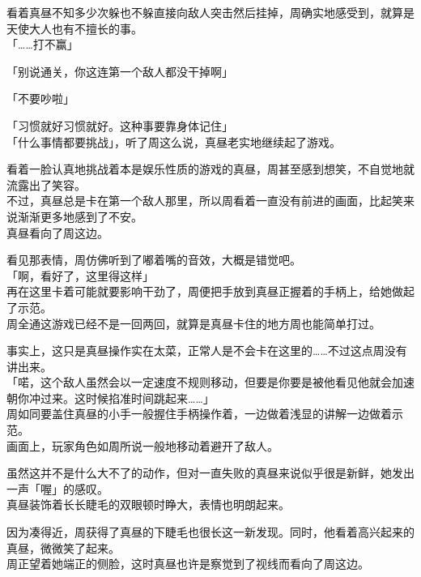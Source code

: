 看着真昼不知多少次躲也不躲直接向敌人突击然后挂掉，周确实地感受到，就算是天使大人也有不擅长的事。\\

「……打不赢」

「别说通关，你这连第一个敌人都没干掉啊」

「不要吵啦」

「习惯就好习惯就好。这种事要靠身体记住」\\

「什么事情都要挑战」，听了周这么说，真昼老实地继续起了游戏。

看着一脸认真地挑战着本是娱乐性质的游戏的真昼，周甚至感到想笑，不自觉地就流露出了笑容。\\

不过，真昼总是卡在第一个敌人那里，所以周看着一直没有前进的画面，比起笑来说渐渐更多地感到了不安。\\

真昼看向了周这边。

看见那表情，周仿佛听到了嘟着嘴的音效，大概是错觉吧。\\

「啊，看好了，这里得这样」\\

再在这里卡着可能就要影响干劲了，周便把手放到真昼正握着的手柄上，给她做起了示范。\\

周全通这游戏已经不是一回两回，就算是真昼卡住的地方周也能简单打过。

事实上，这只是真昼操作实在太菜，正常人是不会卡在这里的……不过这点周没有讲出来。\\

「喏，这个敌人虽然会以一定速度不规则移动，但要是你要是被他看见他就会加速朝你冲过来。这时候掐准时间跳起来……」\\

周如同要盖住真昼的小手一般握住手柄操作着，一边做着浅显的讲解一边做着示范。\\

画面上，玩家角色如周所说一般地移动着避开了敌人。

虽然这并不是什么大不了的动作，但对一直失败的真昼来说似乎很是新鲜，她发出一声「喔」的感叹。\\

真昼装饰着长长睫毛的双眼顿时睁大，表情也明朗起来。

因为凑得近，周获得了真昼的下睫毛也很长这一新发现。同时，他看着高兴起来的真昼，微微笑了起来。\\

周正望着她端正的侧脸，这时真昼也许是察觉到了视线而看向了周这边。\\

